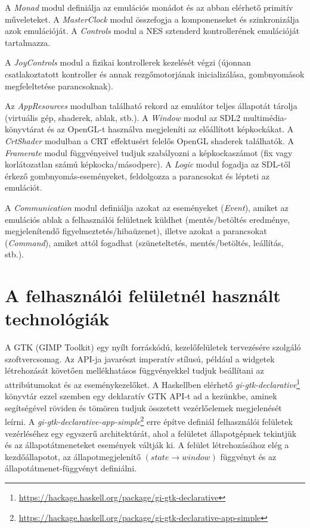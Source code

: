 A \emph{Monad} modul definiálja az emulációs monádot és az abban elérhető primitív műveleteket.
A \emph{MasterClock} modul összefogja a komponenseket és szinkronizálja azok emulációját.
A \emph{Controls} modul a NES sztenderd kontrollerének emulációját tartalmazza.   

A \emph{JoyControls} modul a fizikai kontrollerek kezelését végzi (újonnan csatlakoztatott kontroller és annak rezgőmotorjának inicializálása, gombnyomások megfeleltetése parancsoknak).

Az \emph{AppResources} modulban található rekord az emulátor teljes állapotát tárolja (virtuális gép, shaderek, ablak, stb.).
A \emph{Window} modul az SDL2 multimédia-könyvtárat és az OpenGL-t használva megjeleníti az előállított képkockákat. A \emph{CrtShader} modulban a CRT effektusért felelős OpenGL shaderek találhatók. A \emph{Framerate} modul függvényeivel tudjuk szabályozni a képkockaszámot (fix vagy korlátozatlan számú képkocka/másodperc). A \emph{Logic} modul fogadja az SDL-től érkező gombnyomás-eseményeket, feldolgozza a parancsokat és lépteti az emulációt.

A \emph{Communication} modul definiálja azokat az eseményeket (\emph{Event}), amiket az emulációs ablak a felhasználói felületnek küldhet (mentés/betöltés eredménye, megjelenítendő figyelmeztetés/hibaüzenet), illetve azokat a parancsokat (\emph{Command}), amiket attól fogadhat (szüneteltetés, mentés/betöltés, leállítás, stb.).

\section{A felhasználói felületnél használt technológiák}

A GTK (GIMP Toolkit) egy nyílt forráskódú, kezelőfelületek tervezésére szolgáló szoftvercsomag.
Az API-ja javarészt imperatív stílusú, például a widgetek létrehozását követően mellékhatásos függvényekkel tudjuk beállítani az attribútumokat és az eseménykezelőket. A Haskellben elérhető \emph{gi-gtk-declarative}\footnote{\url{https://hackage.haskell.org/package/gi-gtk-declarative}} könyvtár ezzel szemben egy deklaratív GTK API-t ad a kezünkbe, aminek segítségével röviden és tömören tudjuk összetett vezérlőelemek megjelenését leírni. 
A \emph{gi-gtk-declarative-app-simple}\footnote{\url{https://hackage.haskell.org/package/gi-gtk-declarative-app-simple}} erre építve definiál felhasználói felületek vezérléséhez egy egyszerű architektúrát, ahol a felületet állapotgépnek tekintjük és az állapotátmeneteket események váltják ki. A felület létrehozásához elég a kezdőállapotot, az állapotmegjelenítő $(state \rightarrow window)$ függvényt és az állapotátmenet-függvényt definiálni.

